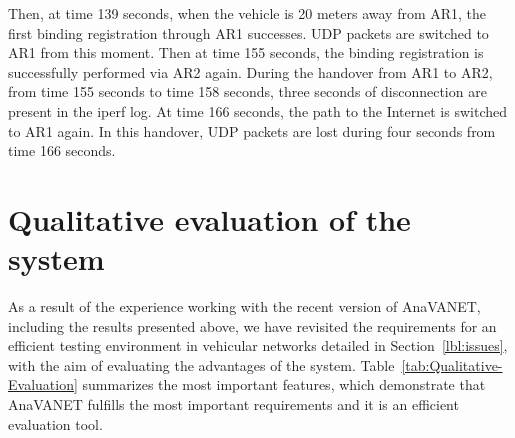\documentclass[fonts]{icst}
\begin{document}
Then, at time 139 seconds, when the vehicle is 20 meters away from AR1, the
first binding registration through AR1 successes. UDP packets are switched to
AR1 from this moment. Then at time 155 seconds, the binding registration is
successfully performed via AR2 again. During the handover from AR1 to AR2, from
time 155 seconds to time 158 seconds, three seconds of disconnection are present
in the iperf log. At time 166 seconds, the path to the Internet is switched to
AR1 again. In this handover, UDP packets are lost during four seconds from time
166 seconds.





\section{Qualitative evaluation of the system}\label{lbl:qualitative}

As a result of the experience working with the recent version of AnaVANET, including the results presented above, we have revisited the requirements for an efficient testing environment in vehicular networks detailed in Section~\ref{lbl:issues}, with the aim of evaluating the advantages of the system. Table~\ref{tab:Qualitative-Evaluation} summarizes the most important features, which demonstrate that AnaVANET fulfills the most important requirements and it is an efficient evaluation tool. 
\end{document}
